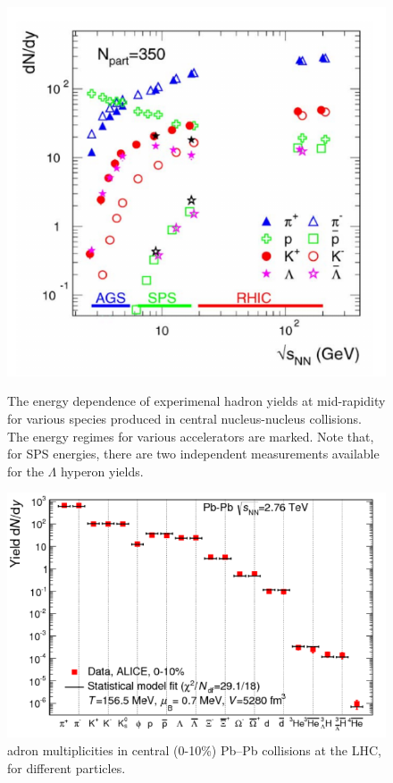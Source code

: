 \documentclass[12pt,a4paper]{book}
\begin{document}
	\begin{figure}
		\centering
		\begin{minipage}{0.45\textwidth}
			\centering
			\includegraphics[width=0.8 \linewidth]{pictures/hadron_yelds.png}
			\caption{ The energy dependence of experimenal hadron yields at	mid-rapidity for various species produced in central nucleus-nucleus collisions. The energy regimes for various accelerators are marked. Note that, for SPS energies, there are two independent measurements available for the $\Lambda$ hyperon yields. \cite{Andronic_2006}}
			\label{fig:hadron_yelds}
		\end{minipage}
		\begin{minipage}{0.45\textwidth}
			\centering
			\includegraphics[width=0.7 \linewidth]{pictures/particle_abbundance.png}
			\caption{adron multiplicities in central (0-10\%) Pb–Pb collisions at the LHC, for different particles.\cite{Andronic_2017}}
			\label{fig:particle_abbundance}
		\end{minipage}
		\centering

\end{figure}
\end{document}
